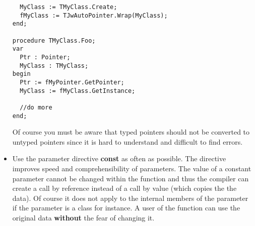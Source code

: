 \documentclass[a4paper,oneside,10pt]{article}
\begin{document}
\begin{itemize}
\begin{lstlisting}
  MyClass := TMyClass.Create;
  fMyClass := TJwAutoPointer.Wrap(MyClass);
end; 

procedure TMyClass.Foo;
var
  Ptr : Pointer;
  MyClass : TMyClass;
begin
  Ptr := fMyPointer.GetPointer;
  MyClass := fMyClass.GetInstance;
  
  //do more
end;
\end{lstlisting}
Of course you must be aware that typed pointers should not be converted to untyped pointers since it is hard to understand and difficult to find errors.

\item Use the parameter directive \textbf{const} as often as possible. The directive improves speed and comprehensibility of parameters. The value of a constant parameter cannot be changed within the function and thus the compiler can create a call by reference instead of a call by value (which copies the the data). Of course it does not apply to the internal members of the parameter if the parameter is a class for instance. A user of the function can use the original data \textbf{without} the fear of changing it.
\end{itemize}



%
%
%
%
%
%
%
\end{document}
